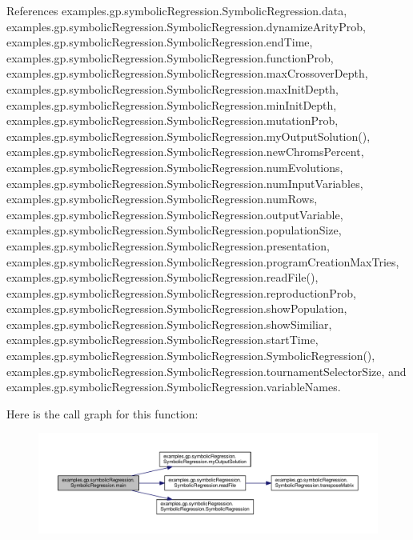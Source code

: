 References examples.\-gp.\-symbolic\-Regression.\-Symbolic\-Regression.\-data, examples.\-gp.\-symbolic\-Regression.\-Symbolic\-Regression.\-dynamize\-Arity\-Prob, examples.\-gp.\-symbolic\-Regression.\-Symbolic\-Regression.\-end\-Time, examples.\-gp.\-symbolic\-Regression.\-Symbolic\-Regression.\-function\-Prob, examples.\-gp.\-symbolic\-Regression.\-Symbolic\-Regression.\-max\-Crossover\-Depth, examples.\-gp.\-symbolic\-Regression.\-Symbolic\-Regression.\-max\-Init\-Depth, examples.\-gp.\-symbolic\-Regression.\-Symbolic\-Regression.\-min\-Init\-Depth, examples.\-gp.\-symbolic\-Regression.\-Symbolic\-Regression.\-mutation\-Prob, examples.\-gp.\-symbolic\-Regression.\-Symbolic\-Regression.\-my\-Output\-Solution(), examples.\-gp.\-symbolic\-Regression.\-Symbolic\-Regression.\-new\-Chroms\-Percent, examples.\-gp.\-symbolic\-Regression.\-Symbolic\-Regression.\-num\-Evolutions, examples.\-gp.\-symbolic\-Regression.\-Symbolic\-Regression.\-num\-Input\-Variables, examples.\-gp.\-symbolic\-Regression.\-Symbolic\-Regression.\-num\-Rows, examples.\-gp.\-symbolic\-Regression.\-Symbolic\-Regression.\-output\-Variable, examples.\-gp.\-symbolic\-Regression.\-Symbolic\-Regression.\-population\-Size, examples.\-gp.\-symbolic\-Regression.\-Symbolic\-Regression.\-presentation, examples.\-gp.\-symbolic\-Regression.\-Symbolic\-Regression.\-program\-Creation\-Max\-Tries, examples.\-gp.\-symbolic\-Regression.\-Symbolic\-Regression.\-read\-File(), examples.\-gp.\-symbolic\-Regression.\-Symbolic\-Regression.\-reproduction\-Prob, examples.\-gp.\-symbolic\-Regression.\-Symbolic\-Regression.\-show\-Population, examples.\-gp.\-symbolic\-Regression.\-Symbolic\-Regression.\-show\-Similiar, examples.\-gp.\-symbolic\-Regression.\-Symbolic\-Regression.\-start\-Time, examples.\-gp.\-symbolic\-Regression.\-Symbolic\-Regression.\-Symbolic\-Regression(), examples.\-gp.\-symbolic\-Regression.\-Symbolic\-Regression.\-tournament\-Selector\-Size, and examples.\-gp.\-symbolic\-Regression.\-Symbolic\-Regression.\-variable\-Names.



Here is the call graph for this function\-:
\nopagebreak
\begin{figure}[H]
\begin{center}
\leavevmode
\includegraphics[width=350pt]{classexamples_1_1gp_1_1symbolic_regression_1_1_symbolic_regression_a88f5444b9429755a7859721f2eb2999d_cgraph}
\end{center}
\end{figure}


